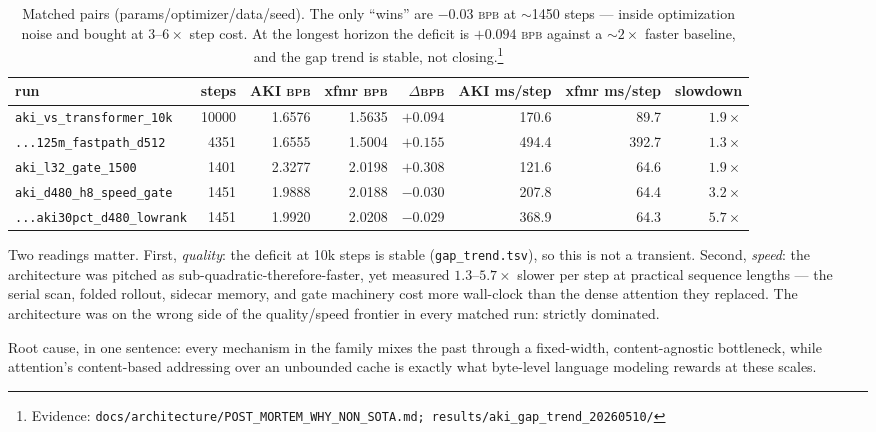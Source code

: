 \documentclass[11pt]{article}
\newcommand{\bpb}{\textsc{bpb}}
\newcommand{\evid}[1]{\footnote{Evidence: \texttt{#1}}}
\begin{document}
\begin{table}[h]
\centering
\footnotesize
\setlength{\tabcolsep}{4pt}
\begin{tabular}{lrrrrrrr}
\toprule
run & steps & AKI \bpb & xfmr \bpb & $\Delta$\bpb & AKI ms/step & xfmr ms/step & slowdown\\
\midrule
\texttt{aki\_vs\_transformer\_10k} & 10000 & 1.6576 & 1.5635 & $+0.094$ & 170.6 & 89.7 & $1.9\times$\\
\texttt{...125m\_fastpath\_d512} & 4351 & 1.6555 & 1.5004 & $+0.155$ & 494.4 & 392.7 & $1.3\times$\\
\texttt{aki\_l32\_gate\_1500} & 1401 & 2.3277 & 2.0198 & $+0.308$ & 121.6 & 64.6 & $1.9\times$\\
\texttt{aki\_d480\_h8\_speed\_gate} & 1451 & 1.9888 & 2.0188 & $-0.030$ & 207.8 & 64.4 & $3.2\times$\\
\texttt{...aki30pct\_d480\_lowrank} & 1451 & 1.9920 & 2.0208 & $-0.029$ & 368.9 & 64.3 & $5.7\times$\\
\bottomrule
\end{tabular}
\caption{Matched pairs (params/optimizer/data/seed). The only ``wins'' are
$-0.03$ \bpb{} at $\sim$1450 steps --- inside optimization noise and bought at
$3$--$6\times$ step cost. At the longest horizon the deficit is $+0.094$ \bpb{}
against a $\sim2\times$ faster baseline, and the gap trend is stable, not
closing.\protect\evid{docs/architecture/POST\_MORTEM\_WHY\_NON\_SOTA.md;
results/aki\_gap\_trend\_20260510/}}
\label{tab:matched}
\end{table}

Two readings matter. First, \emph{quality}: the deficit at 10k steps is stable
(\texttt{gap\_trend.tsv}), so this is not a transient. Second, \emph{speed}:
the architecture was pitched as sub-quadratic-therefore-faster, yet measured
$1.3$--$5.7\times$ slower per step at practical sequence lengths --- the serial
scan, folded rollout, sidecar memory, and gate machinery cost more wall-clock
than the dense attention they replaced. The architecture was on the wrong side
of the quality/speed frontier in every matched run: strictly dominated.

Root cause, in one sentence: every mechanism in the family mixes the past
through a fixed-width, content-agnostic bottleneck, while attention's
content-based addressing over an unbounded cache is exactly what byte-level
language modeling rewards at these scales.
\end{document}
